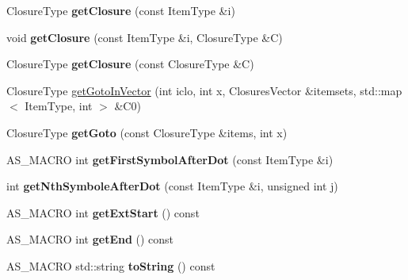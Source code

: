 \begin{DoxyCompactItemize}
\item 
\mbox{\label{classx2_1_1_l_r_gramma_aa2b002dcbb20cbc063f45e0c91bcaf92}} 
Closure\+Type {\bfseries get\+Closure} (const Item\+Type \&i)
\item 
\mbox{\label{classx2_1_1_l_r_gramma_a68fcd9ffac09218b72d5188e37bd3330}} 
void {\bfseries get\+Closure} (const Item\+Type \&i, Closure\+Type \&C)
\item 
\mbox{\label{classx2_1_1_l_r_gramma_ac8ddf976b25cfbc6088653a341a95e14}} 
Closure\+Type {\bfseries get\+Closure} (const Closure\+Type \&C)
\item 
Closure\+Type \hyperlink{classx2_1_1_l_r_gramma_a933cdf18c4a8515dbeef0cea0bdaf04e}{get\+Goto\+In\+Vector} (int iclo, int x, Closures\+Vector \&itemsets, std\+::map$<$ Item\+Type, int $>$ \&C0)
\item 
\mbox{\label{classx2_1_1_l_r_gramma_aed7c1b2c750a4267d2482849efa80a0c}} 
Closure\+Type {\bfseries get\+Goto} (const Closure\+Type \&items, int x)
\item 
\mbox{\label{classx2_1_1_l_r_gramma_af93dc3f5f2754571065efcb5db90c61d}} 
A\+S\+\_\+\+M\+A\+C\+RO int {\bfseries get\+First\+Symbol\+After\+Dot} (const Item\+Type \&i)
\item 
\mbox{\label{classx2_1_1_l_r_gramma_a264d5976acad1bcbbca757ff2732cda2}} 
int {\bfseries get\+Nth\+Symbole\+After\+Dot} (const Item\+Type \&i, unsigned int j)
\item 
\mbox{\label{classx2_1_1_l_r_gramma_a3e5af1beed3487756cb31d7e1fe8f680}} 
A\+S\+\_\+\+M\+A\+C\+RO int {\bfseries get\+Ext\+Start} () const
\item 
\mbox{\label{classx2_1_1_l_r_gramma_aac75b15832f2ccba608d5caefe3f66ba}} 
A\+S\+\_\+\+M\+A\+C\+RO int {\bfseries get\+End} () const
\item 
\mbox{\label{classx2_1_1_l_r_gramma_a687589eac850af2bcdb012b740531a2e}} 
A\+S\+\_\+\+M\+A\+C\+RO std\+::string {\bfseries to\+String} () const
\item 

\end{DoxyCompactItemize}
